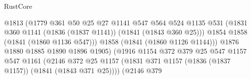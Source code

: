 \begin{lexlean}{RustCore}
\begin{coremodule}
                                              @1813
                                              (@1779
                                                @361
                                                @50
                                                @25
                                                @27
                                                @1141
                                                @547
                                                @564
                                                @524
                                                @1135
                                                @531
                                                (@1831
                                                  @360
                                                  @1141
                                                  (@1836 (@1837 @1141))
                                                  (@1841 (@1843 @360 @25)))
                                                @1854
                                                @1858
                                                (@1841 (@1860 @1136 @547)))
                                              @1858
                                              (@1841 (@1860 @1126 @1144)))
                                            @1876
                                            @1880
                                            @1885
                                            @1890
                                            @1896
                                            @1905)
                                          (@1916
                                            @1154
                                            @372
                                            @379
                                            @25
                                            @547
                                            @1157
                                            @547
                                            @1161
                                            (@2146
                                              @372
                                              @25
                                              @1157
                                              (@1831
                                                @371
                                                @1157
                                                (@1836 (@1837 @1157))
                                                (@1841 (@1843 @371 @25))))
                                            (@2146
                                              @379

\end{coremodule}
\end{lexlean}
